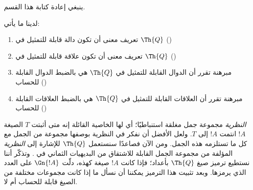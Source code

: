\documentclass[../../../include/open-logic-section]{subfiles}
\begin{document}


\begin{editorial}
ينبغي إعادة كتابة هذا القسم.
\end{editorial}

لدينا ما يأتي:
\begin{enumerate}
\item تعريف معنى أن تكون دالة قابلة للتمثيل في $\Th{Q}$
  ()
\item تعريف معنى أن تكون علاقة قابلة للتمثيل في $\Th{Q}$
  ()
\item مبرهنة تقرر أن الدوال القابلة للتمثيل في $\Th{Q}$ هي بالضبط
  الدوال القابلة للحساب
  ()
\item مبرهنة تقرر أن العلاقات القابلة للتمثيل في $\Th{Q}$ هي بالضبط
  العلاقات القابلة للحساب
  ()
\end{enumerate}

{\em النظرية} مجموعة جمل مغلقة استنباطيًا؛ أي لها الخاصية القائلة إنه
متى أثبتت $T$ الصيغة $!A$ انتمت $!A$ إلى $T$. ولعل الأفضل أن نفكر في
النظرية بوصفها مجموعة من الجمل مع كل ما تستلزمه هذه الجمل. ومن الآن
فصاعدًا سنستعمل $\Th{Q}$ للإشارة إلى {\em النظرية} المؤلفة من مجموعة
الجمل القابلة للاشتقاق من البديهيات الثماني في
. وتذكّر أننا نستطيع ترميز صيغ $\Th{Q}$ بأعداد؛
فإذا كانت $!A$ صيغة كهذه، دلّت $\Gn{!A}$ على العدد الذي يرمزها. وبعد
تثبيت هذا الترميز يمكننا أن نسأل ما إذا كانت مجموعات مختلفة من الصيغ
قابلة للحساب أم لا.
\end{document}

